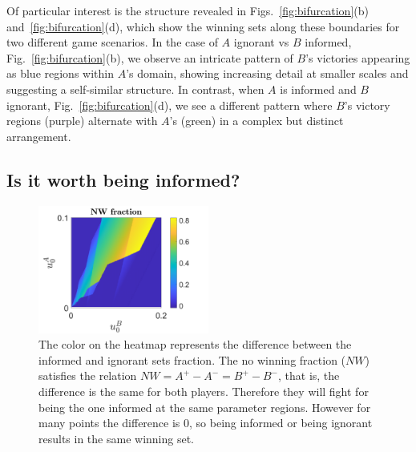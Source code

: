 Of particular interest is the structure revealed in Figs.~\ref{fig:bifurcation}(b) and~\ref{fig:bifurcation}(d), which show the winning sets along these boundaries for two different game scenarios. In the case of $A$ ignorant vs $B$ informed, Fig.~\ref{fig:bifurcation}(b), we observe an intricate pattern of $B$'s victories appearing as blue regions within $A$'s domain, showing increasing detail at smaller scales and suggesting a self-similar structure. In contrast, when $A$ is informed and $B$ ignorant, Fig.~\ref{fig:bifurcation}(d), we see a different pattern where $B$'s victory regions (purple) alternate with $A$'s (green) in a complex but distinct arrangement.





\subsection{Is it worth being informed?}


\begin{figure}
    \centering
    \includegraphics[trim={0cm 0cm 0cm 0cm}, clip,width=0.5\textwidth ]{Images/P5/diferencia.png}
    \caption{The color on the heatmap represents the difference between the informed and ignorant sets fraction. The no winning fraction ($NW$) satisfies the relation $NW = A^{+} - A^{-} = B^{+} - B^{-}$, that is, the difference is the same for both players. Therefore they will fight for being the one informed at the same parameter regions. However for many points the difference is $0$, so being informed or being ignorant results in the same winning set.}
    \label{fig:diferencia}
\end{figure}

